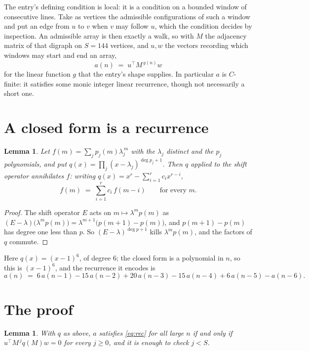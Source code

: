 \documentclass[11pt,a4paper]{article}
\theoremstyle{plain}
\newtheorem{lemma}[theorem]{Lemma}
\theoremstyle{definition}
\begin{document}
The entry's defining condition is local: it is a condition on a bounded window of consecutive lines. Take as vertices the
admissible configurations of such a window and put an edge from $u$ to $v$ when $v$ may
follow $u$, which the condition decides by inspection. An admissible array is then exactly a
walk, so with $M$ the adjacency matrix of that digraph on $S=144$ vertices, and $u,w$ the
vectors recording which windows may start and end an array,
\[
a(n)\;=\;u^{\!\top}M^{\,g(n)}w
\]
for the linear function $g$ that the entry's shape supplies. In particular $a$ is
$C$-finite: it satisfies some monic integer linear recurrence, though not necessarily a short
one.

\section{A closed form is a recurrence}

\begin{lemma}\label{lem:ann}
Let $f(m)=\sum_{j}p_j(m)\lambda_j^{\,m}$ with the $\lambda_j$ distinct and the $p_j$
polynomials, and put $q(x)=\prod_j(x-\lambda_j)^{\deg p_j+1}$. Then $q$ applied to the shift
operator annihilates $f$: writing $q(x)=x^{r}-\sum_{i=1}^{r}c_ix^{r-i}$,
\[
f(m)\;=\;\sum_{i=1}^{r}c_i\,f(m-i)\qquad\text{for every }m.
\]
\end{lemma}

\begin{proof}
The shift operator $E$ acts on $m\mapsto\lambda^{m}p(m)$ as
$(E-\lambda)\bigl(\lambda^{m}p(m)\bigr)=\lambda^{m+1}\bigl(p(m+1)-p(m)\bigr)$, and
$p(m+1)-p(m)$ has degree one less than $p$. So $(E-\lambda)^{\deg p+1}$ kills
$\lambda^{m}p(m)$, and the factors of $q$ commute.
\end{proof}

Here $q(x)=(x-1)^{6}$, of degree $6$; the closed form is a polynomial in $n$, so this is $(x-1)^{6}$, and the recurrence it encodes is
\begin{equation}\label{eq:rec}
a(n)\;=\;6\,a(n-1) - 15\,a(n-2) + 20\,a(n-3) - 15\,a(n-4) + 6\,a(n-5) - a(n-6).
\end{equation}

\section{The proof}

\begin{lemma}\label{lem:crit}
With $q$ as above, $a$ satisfies \eqref{eq:rec} for all large $n$ if and only if
$u^{\!\top}M^{\,j}q(M)w=0$ for every $j\ge0$, and it is enough to check $j<S$.
\end{lemma}
\end{document}
